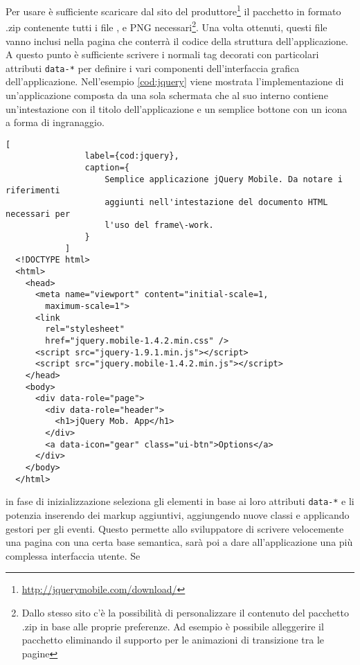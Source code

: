             Per usare \jqm{} è sufficiente scaricare dal sito del
            produttore\footnote{\url{http://jquerymobile.com/download/}} il
            pacchetto in formato .zip contenente tutti i file \js{}, \css{} e
            PNG necessari\footnote{Dallo stesso sito c'è la possibilità di
            personalizzare il contenuto del pacchetto .zip in base alle proprie
            preferenze. Ad esempio è possibile alleggerire il pacchetto
            eliminando il supporto per le animazioni di transizione tra le
            pagine}. Una volta ottenuti, questi file vanno inclusi nella pagina
            \html{} che conterrà il codice della struttura dell'applicazione. A
            questo punto è sufficiente scrivere i normali tag \html{} decorati con
            particolari attributi \verb|data-*| per definire i vari componenti
            dell'interfaccia grafica dell'applicazione. Nell'esempio \ref{cod:jquery}
            viene mostrata l'implementazione di un'applicazione composta da
            una sola schermata che al suo interno contiene un'intestazione con
            il titolo dell'applicazione e un semplice bottone con un icona a
            forma di ingranaggio.\clearpage
            \begin{lstlisting}[
                label={cod:jquery},
                caption={
                    Semplice applicazione jQuery Mobile. Da notare i riferimenti
                    aggiunti nell'intestazione del documento HTML necessari per
                    l'uso del frame\-work.
                }
            ]
  <!DOCTYPE html>
  <html>
    <head>
      <meta name="viewport" content="initial-scale=1,
        maximum-scale=1">
      <link
        rel="stylesheet"
        href="jquery.mobile-1.4.2.min.css" />
      <script src="jquery-1.9.1.min.js"></script>
      <script src="jquery.mobile-1.4.2.min.js"></script>
    </head>
    <body>
      <div data-role="page">
        <div data-role="header">
          <h1>jQuery Mob. App</h1>
        </div>
        <a data-icon="gear" class="ui-btn">Options</a>
      </div>
    </body>
  </html>
            \end{lstlisting}
            \jqm{} in fase di inizializzazione seleziona gli elementi in
            base ai loro attributi \verb|data-*| e li potenzia inserendo dei markup
            aggiuntivi, aggiungendo nuove classi \css{} e applicando gestori per gli
            eventi. Questo permette allo sviluppatore di scrivere velocemente
            una pagina con una certa base semantica, sarà poi \jqm{} a
            dare all'applicazione una più complessa interfaccia utente. Se
